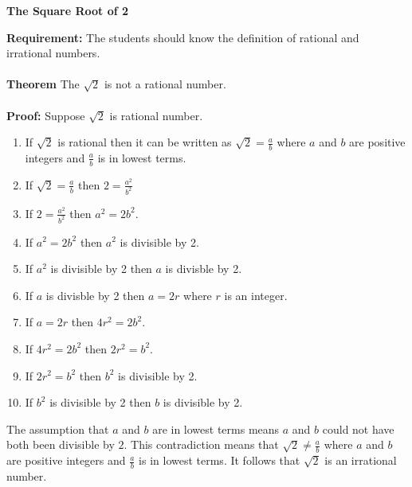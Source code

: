\documentclass[12pt]{article}
\begin{document}
\begin{center}
	{\Large \textbf{The Square Root of 2}}\\
\end{center}
\textbf{Requirement:} The students should know the definition of rational and irrational
numbers. \\\\
{\bf Theorem} The $\sqrt{2}$ is not a rational number. \\\\
\textbf{Proof:} Suppose $\sqrt{2}$ is rational number.
\begin{enumerate}
\item If $\sqrt{2}$ is rational then it can be written as $\sqrt{2}=\frac{a}{b}$ where 
$a$ and $b$ are positive integers and $\frac{a}{b}$ is in lowest terms.
\item If $\sqrt{2}=\frac{a}{b}$ then $2=\frac{a^2}{b^2}$
\item If $2=\frac{a^2}{b^2}$ then $a^2=2b^2$.
\item If $a^2=2b^2$ then $a^2$ is divisible by 2.
\item If $a^2$ is divisible by 2 then $a$ is divisble by 2.
\item If $a$ is divisble by 2 then $a=2r$ where $r$ is an integer.
\item If $a=2r$ then $4r^2=2b^2$.
\item If $4r^2=2b^2$ then $2r^2=b^2$.
\item If $2r^2=b^2$ then $b^2$ is divisible by 2.
\item If $b^2$ is divisible by 2 then $b$ is divisible by 2. 
\end{enumerate}
The assumption that $a$ and $b$ are in lowest terms means $a$ and $b$ could not have both been
divisible by $2$. This contradiction means that $\sqrt{2} \neq \frac{a}{b}$ where $a$ and $b$ are
positive integers and $\frac{a}{b}$ is in lowest terms. It follows that $\sqrt{2}$ is an
irrational number.
\end{document}
